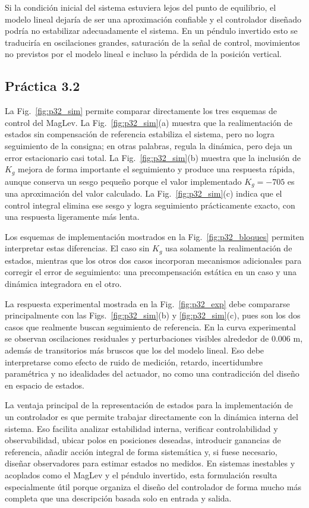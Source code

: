 \documentclass[conference]{IEEEtran}
\begin{document}
Si la condici\'on inicial del sistema estuviera lejos del punto de equilibrio, el modelo lineal dejar\'ia de ser una aproximaci\'on confiable y el controlador dise\~nado podr\'ia no estabilizar adecuadamente el sistema. En un p\'endulo invertido esto se traducir\'ia en oscilaciones grandes, saturaci\'on de la se\~nal de control, movimientos no previstos por el modelo lineal e incluso la p\'erdida de la posici\'on vertical.

\subsection{Pr\'actica 3.2}

La Fig.~\ref{fig:p32_sim} permite comparar directamente los tres esquemas de control del MagLev. La Fig.~\ref{fig:p32_sim}(a) muestra que la realimentaci\'on de estados sin compensaci\'on de referencia estabiliza el sistema, pero no logra seguimiento de la consigna; en otras palabras, regula la din\'amica, pero deja un error estacionario casi total. La Fig.~\ref{fig:p32_sim}(b) muestra que la inclusi\'on de $K_g$ mejora de forma importante el seguimiento y produce una respuesta r\'apida, aunque conserva un sesgo peque\~no porque el valor implementado $K_g=-705$ es una aproximaci\'on del valor calculado. La Fig.~\ref{fig:p32_sim}(c) indica que el control integral elimina ese sesgo y logra seguimiento pr\'acticamente exacto, con una respuesta ligeramente m\'as lenta.

Los esquemas de implementaci\'on mostrados en la Fig.~\ref{fig:p32_bloques} permiten interpretar estas diferencias. El caso sin $K_g$ usa solamente la realimentaci\'on de estados, mientras que los otros dos casos incorporan mecanismos adicionales para corregir el error de seguimiento: una precompensaci\'on est\'atica en un caso y una din\'amica integradora en el otro.

La respuesta experimental mostrada en la Fig.~\ref{fig:p32_exp} debe compararse principalmente con las Figs.~\ref{fig:p32_sim}(b) y \ref{fig:p32_sim}(c), pues son los dos casos que realmente buscan seguimiento de referencia. En la curva experimental se observan oscilaciones residuales y perturbaciones visibles alrededor de $0.006$ m, adem\'as de transitorios m\'as bruscos que los del modelo lineal. Eso debe interpretarse como efecto de ruido de medici\'on, retardo, incertidumbre param\'etrica y no idealidades del actuador, no como una contradicci\'on del dise\~no en espacio de estados.

La ventaja principal de la representaci\'on de estados para la implementaci\'on de un controlador es que permite trabajar directamente con la din\'amica interna del sistema. Eso facilita analizar estabilidad interna, verificar controlabilidad y observabilidad, ubicar polos en posiciones deseadas, introducir ganancias de referencia, a\~nadir acci\'on integral de forma sistem\'atica y, si fuese necesario, dise\~nar observadores para estimar estados no medidos. En sistemas inestables y acoplados como el MagLev y el p\'endulo invertido, esta formulaci\'on resulta especialmente \'util porque organiza el dise\~no del controlador de forma mucho m\'as completa que una descripci\'on basada solo en entrada y salida.
\end{document}
